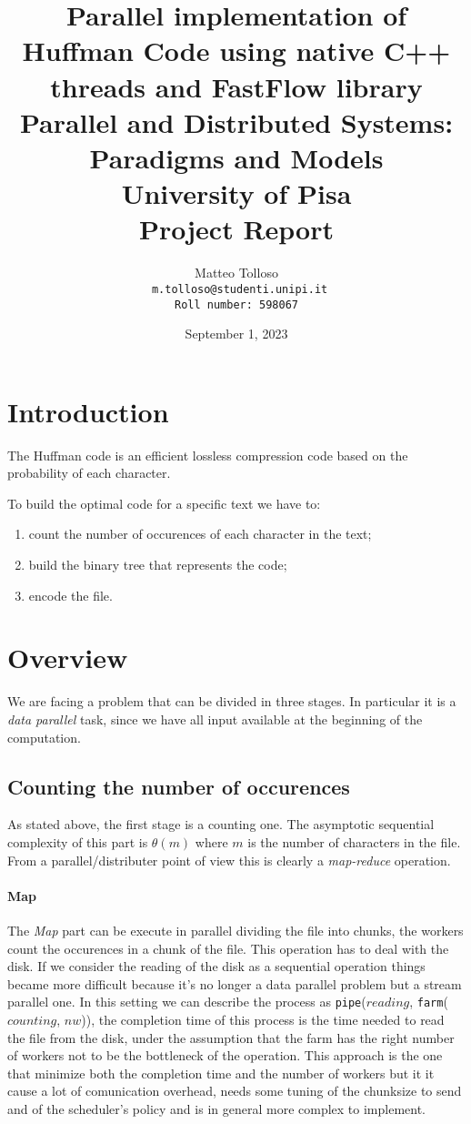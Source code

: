 \documentclass[12pt, letterpaper]{article}  %
\title{\vspace{2cm}\textbf{Parallel implementation of Huffman Code using native C++ threads and FastFlow library} \\
        \bigskip
        \Large{
            \medskip
            Parallel and Distributed Systems: Paradigms and Models \\
            \medskip
            University of Pisa \\
            \medskip
            Project Report\\
            \medskip
        }
}
\author{
  {Matteo Tolloso}\\
  \texttt{ \scriptsize{m.tolloso@studenti.unipi.it}}\\
  \texttt{\scriptsize{Roll number: 598067}} \\
}
\begin{document}
\nocite{*}
\date{September 1, 2023}
\maketitle

\newpage

\section{Introduction}
The Huffman code is an efficient lossless compression code based on the probability of each character.

To build the optimal code for a specific text we have to:
\begin{enumerate}
    \item count the number of occurences of each character in the text;
    \item build the binary tree that represents the code;
    \item encode the file.
\end{enumerate}

\section{Overview}

We are facing a problem that can be divided in three stages. In particular it is a \textit{data parallel} task, since we have all input available at the beginning of the computation.

\subsection{Counting the number of occurences}
As stated above, the first stage is a counting one. The asymptotic sequential complexity of this part is $\theta(m)$ where $m$ is the number of characters in the file.
From a parallel/distributer point of view this is clearly a \textit{map-reduce} operation.

\paragraph*{Map}
The \textit{Map} part can be execute in parallel dividing the file into chunks, the workers count the occurences in a chunk of the file. 
This operation has to deal with the disk. If we consider the reading of the disk as a sequential operation things became more difficult because it's no longer a data parallel problem but a stream parallel one. In this setting we can describe the process as \texttt{pipe}($reading$, \texttt{farm}($counting$, $nw$)), the completion time of this process is the time needed to read the file from the disk, under the assumption that the farm has the right number of workers not to be the bottleneck of the operation. This approach is the one that minimize both the completion time and the number of workers but it it cause a lot of comunication overhead, needs some tuning of the chunksize to send and of the scheduler's policy and is in general more complex to implement.
\end{document}

